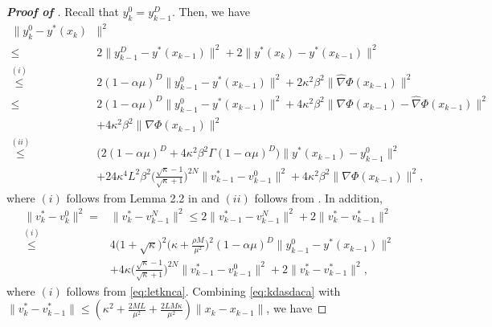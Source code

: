 \documentclass{osudissert96}
\begin{document}
\begin{proof}[\bf Proof of ]
Recall that $y^0_k=y^D_{k-1}$. Then, we have 
\begin{align}\label{wocaoleis}
\|y^0_k-y^*(x_k)&\|^2 \nonumber
\\\leq &2\|y^D_{k-1}-y^*(x_{k-1})\|^2 + 2\|y^*(x_k)-y^*(x_{k-1})\|^2 \nonumber
\\\overset{(i)}\leq& 2(1-\alpha\mu)^{D} \|y_{k-1}^0-y^*(x_{k-1})\|^2 + 2\kappa^2\beta^2\|\widehat \nabla \Phi(x_{k-1})\|^2 \nonumber
\\\leq&2(1-\alpha\mu)^{D} \|y_{k-1}^0-y^*(x_{k-1})\|^2 + 4\kappa^2\beta^2\| \nabla \Phi(x_{k-1})-\widehat \nabla \Phi(x_{k-1})\|^2  \nonumber
\\&+ 4\kappa^2\beta^2 \| \nabla \Phi(x_{k-1})\|^2 \nonumber
\\\overset{(ii)}\leq&\big(2(1-\alpha\mu)^{D}+ 4\kappa^2\beta^2\Gamma (1-\alpha \mu)^D\big)\|y^*(x_{k-1})-y_{k-1}^0\|^2\nonumber
\\ &+24\kappa^4L^2\beta^2  \Big( \frac{\sqrt{\kappa}-1}{\sqrt{\kappa}+1} \Big)^{2N} \|v_{k-1}^*-v_{k-1}^0\|^2+ 4\kappa^2\beta^2 \| \nabla \Phi(x_{k-1})\|^2,
\end{align}
where $(i)$ follows from Lemma 2.2 in \cite{ghadimi2018approximation} and $(ii)$ follows from . In addition, 
\begin{align}\label{eq:kdasdaca}
\|v_k^*-v_k^0\|^2 =& \|v_k^*-v_{k-1}^N\|^2 \leq 2\|v_{k-1}^*-v_{k-1}^N\|^2+2\|v_k^*-v_{k-1}^*\|^2 \nonumber
\\\overset{(i)}\leq &4 \Big(1+\sqrt{\kappa}\Big)^2\Big(\kappa +\frac{\rho M}{\mu^2} \Big)^2(1-\alpha\mu)^D\|y_{k-1}^0-y^*(x_{k-1})\|^2 \nonumber
\\&+4\kappa \Big( \frac{\sqrt{\kappa}-1}{\sqrt{\kappa}+1} \Big)^{2N}\|v_{k-1}^*-v_{k-1}^0\|^2 + 2\|v_k^*-v_{k-1}^*\|^2, 
\end{align}
where $(i)$ follows from \cref{eq:letknca}. Combining \cref{eq:kdasdaca} with $\|v_k^*-v_{k-1}^*\|\leq(\kappa^2+\frac{2ML}{\mu^2}+\frac{2LM\kappa}{\mu^2})\|x_k-x_{k-1}\|$, we have 

\end{proof}
\end{document}
